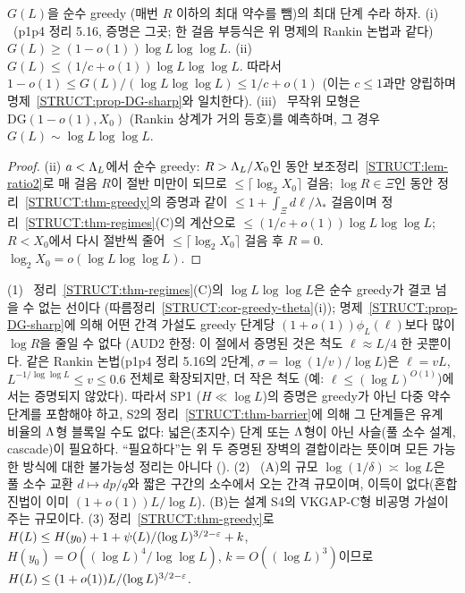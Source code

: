 \begin{corollary}\label{STRUCT:cor-greedy-theta}
$G(L)$을 순수 greedy (매번 $R$ 이하의 최대 약수를 뺌)의 최대 단계 수라 하자.
(i) \PROVED\ (p1p4 정리 5.16, 증명은 그곳; 한 걸음 부등식은 위 명제의 Rankin 논법과 같다) $G(L)\ge(1-o(1))\log L\log\log L$.
(ii)  $G(L)\le(1/c+o(1))\log L\log\log L$. 따라서 $1-o(1)\le G(L)/(\log L\log\log L)\le1/c+o(1)$ (이는 $c\le1$과만 양립하며 명제~\ref{STRUCT:prop-DG-sharp}와 일치한다).
(iii) \HEUR\ 무작위 모형은 $\mathrm{DG}(1-o(1),X_0)$ (Rankin 상계가 거의 등호)를 예측하며, 그 경우 $G(L)\sim\log L\log\log L$.
\end{corollary}
\begin{proof}
(ii) $a<\Lambda_L$에서 순수 greedy: $R>\Lambda_L/X_0$인 동안 보조정리~\ref{STRUCT:lem-ratio2}로 매 걸음 $R$이 절반 미만이 되므로 $\le\lceil\log_2X_0\rceil$ 걸음; $\log R\in\Xi$인 동안 정리~\ref{STRUCT:thm-greedy}의 증명과 같이 $\le1+\int_\Xi d\ell/\lambda_*$ 걸음이며 정리~\ref{STRUCT:thm-regimes}(C)의 계산으로 $\le(1/c+o(1))\log L\log\log L$; $R<X_0$에서 다시 절반씩 줄어 $\le\lceil\log_2X_0\rceil$ 걸음 후 $R=0$. $\log_2X_0=o(\log L\log\log L)$.
\end{proof}

\begin{remark}[사다리에서의 의미]\label{STRUCT:rem-S3-meaning}
(1) \PROVED\ 정리~\ref{STRUCT:thm-regimes}(C)의 $\log L\log\log L$은 순수 greedy가 결코 넘을 수 없는 선이다 (따름정리~\ref{STRUCT:cor-greedy-theta}(i)); 명제~\ref{STRUCT:prop-DG-sharp}에 의해 어떤 간격 가설도 greedy 단계당 $(1+o(1))\phi_L(\ell)$보다 많이 $\log R$을 줄일 수 없다
(AUD2 한정: 이 절에서 증명된 것은 척도 $\ell\approx L/4$ 한 곳뿐이다. 같은 Rankin 논법(p1p4 정리 5.16의 2단계, $\sigma=\log(1/v)/\log L$)은 $\ell=vL$, $L^{-1/\log\log L}\le v\le0.6$ 전체로 확장되지만, 더 작은 척도 (예: $\ell\le(\log L)^{O(1)}$)에서는 증명되지 않았다). 따라서 SP1 ($H\ll\log L$)의 증명은 greedy가 아닌 다중 약수 단계를 포함해야 하고, S2의 정리~\ref{STRUCT:thm-barrier}에 의해 그 단계들은 유계 비율의 $\Lambda$형 블록일 수도 없다: 넓은(초지수) 단계 또는 $\Lambda$형이 아닌 사슬(풀 소수 설계, cascade)이 필요하다. ``필요하다''는 위 두 증명된 장벽의 결합이라는 뜻이며 모든 가능한 방식에 대한 불가능성 정리는 아니다 (\HEUR).
(2) \HEUR\ (A)의 규모 $\log(1/\delta)\asymp\log L$은 풀 소수 교환 $d\mapsto dp/q$와 짧은 구간의 소수에서 오는 간격 규모이며, 이득이 없다(혼합진법이 이미 $(1+o(1))L/\log L$). (B)는 설계 S4의 VKGAP-C형 비공명 가설이 주는 규모이다.
(3)  정리~\ref{STRUCT:thm-greedy}로 $H(L)\le H(y_0)+1+\psi(L)/(\log L)^{3/2-\varepsilon}+k$, $H(y_0)=O((\log L)^4/\log\log L)$, $k=O((\log L)^3)$이므로 $H(L)\le(1+o(1))L/(\log L)^{3/2-\varepsilon}$.
\end{remark}

